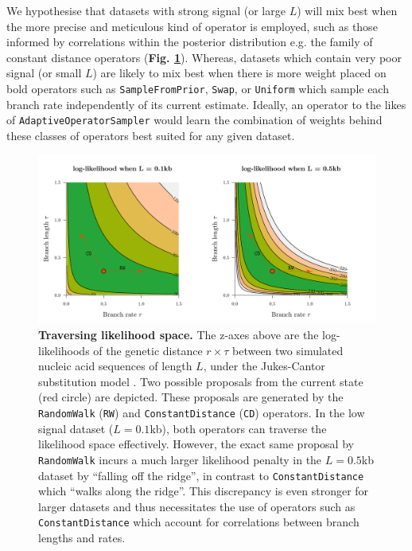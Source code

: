 \documentclass[10pt,letterpaper]{article}
\begin{document}
We hypothesise that datasets with strong signal (or large $L$) will mix best when the more precise and meticulous kind of operator is employed, such as those informed by correlations within the posterior distribution e.g. the family of constant distance operators \cite{zhang2020improving} (\textbf{Fig. \ref{fig:rateparams}}).
Whereas, datasets which contain very poor signal (or small $L$) are likely to mix best when there is more weight placed on bold operators such as \texttt{SampleFromPrior}, \texttt{Swap}, or \texttt{Uniform} which sample each branch rate independently of its current estimate.
Ideally, an operator to the likes of \texttt{AdaptiveOperatorSampler} would learn the combination of weights behind these classes of operators best suited for any given dataset.




\begin{figure}[!h]
\includegraphics[width=\textwidth]{Figures/correlations.pdf}
\caption{\textbf{Traversing likelihood space.}
The z-axes above are the log-likelihoods of the genetic distance $r \times \tau$ between two simulated nucleic acid sequences of length $L$, under the Jukes-Cantor substitution model \cite{jukes1969evolution}. 
Two possible proposals from the current state (red circle) are depicted.
These proposals are generated by the \texttt{RandomWalk} (\texttt{RW}) and \texttt{ConstantDistance} (\texttt{CD}) operators.
In the low signal dataset ($L=0.1$kb), both operators can traverse the likelihood space effectively.
 However, the exact same proposal by \texttt{RandomWalk} incurs a much larger likelihood penalty in the $L=0.5$kb dataset by ``falling off the ridge'', in contrast to \texttt{ConstantDistance} which ``walks along the ridge''.
 This discrepancy is even stronger for larger datasets and thus necessitates the use of operators such as \texttt{ConstantDistance} which account for correlations between branch lengths and rates. }
\label{fig:rateparams}
\end{figure}
\end{document}
